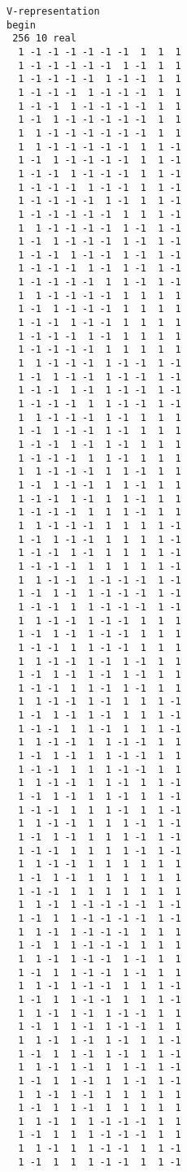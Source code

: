 \documentclass[%
 showpacs,
 showkeys,
 preprintnumbers,
 amsmath,amssymb,
 aps,
  pra,
  longbibliography,
 floatfix,
 ]{revtex4-1}
\begin{document}
{\begin{lstlisting}[backgroundcolor=\color{yellow!10},framerule=0pt,breaklines=true, frame=tb]
V-representation
begin
 256 10 real
  1 -1 -1 -1 -1 -1 -1  1  1  1
  1 -1 -1 -1 -1 -1  1 -1  1  1
  1 -1 -1 -1 -1  1 -1 -1  1  1
  1 -1 -1 -1  1 -1 -1 -1  1  1
  1 -1 -1  1 -1 -1 -1 -1  1  1
  1 -1  1 -1 -1 -1 -1 -1  1  1
  1  1 -1 -1 -1 -1 -1 -1  1  1
  1  1 -1 -1 -1 -1 -1  1  1 -1
  1 -1  1 -1 -1 -1 -1  1  1 -1
  1 -1 -1  1 -1 -1 -1  1  1 -1
  1 -1 -1 -1  1 -1 -1  1  1 -1
  1 -1 -1 -1 -1  1 -1  1  1 -1
  1 -1 -1 -1 -1 -1  1  1  1 -1
  1  1 -1 -1 -1 -1  1 -1  1 -1
  1 -1  1 -1 -1 -1  1 -1  1 -1
  1 -1 -1  1 -1 -1  1 -1  1 -1
  1 -1 -1 -1  1 -1  1 -1  1 -1
  1 -1 -1 -1 -1  1  1 -1  1 -1
  1  1 -1 -1 -1 -1  1  1  1  1
  1 -1  1 -1 -1 -1  1  1  1  1
  1 -1 -1  1 -1 -1  1  1  1  1
  1 -1 -1 -1  1 -1  1  1  1  1
  1 -1 -1 -1 -1  1  1  1  1  1
  1  1 -1 -1 -1  1 -1 -1  1 -1
  1 -1  1 -1 -1  1 -1 -1  1 -1
  1 -1 -1  1 -1  1 -1 -1  1 -1
  1 -1 -1 -1  1  1 -1 -1  1 -1
  1  1 -1 -1 -1  1 -1  1  1  1
  1 -1  1 -1 -1  1 -1  1  1  1
  1 -1 -1  1 -1  1 -1  1  1  1
  1 -1 -1 -1  1  1 -1  1  1  1
  1  1 -1 -1 -1  1  1 -1  1  1
  1 -1  1 -1 -1  1  1 -1  1  1
  1 -1 -1  1 -1  1  1 -1  1  1
  1 -1 -1 -1  1  1  1 -1  1  1
  1  1 -1 -1 -1  1  1  1  1 -1
  1 -1  1 -1 -1  1  1  1  1 -1
  1 -1 -1  1 -1  1  1  1  1 -1
  1 -1 -1 -1  1  1  1  1  1 -1
  1  1 -1 -1  1 -1 -1 -1  1 -1
  1 -1  1 -1  1 -1 -1 -1  1 -1
  1 -1 -1  1  1 -1 -1 -1  1 -1
  1  1 -1 -1  1 -1 -1  1  1  1
  1 -1  1 -1  1 -1 -1  1  1  1
  1 -1 -1  1  1 -1 -1  1  1  1
  1  1 -1 -1  1 -1  1 -1  1  1
  1 -1  1 -1  1 -1  1 -1  1  1
  1 -1 -1  1  1 -1  1 -1  1  1
  1  1 -1 -1  1 -1  1  1  1 -1
  1 -1  1 -1  1 -1  1  1  1 -1
  1 -1 -1  1  1 -1  1  1  1 -1
  1  1 -1 -1  1  1 -1 -1  1  1
  1 -1  1 -1  1  1 -1 -1  1  1
  1 -1 -1  1  1  1 -1 -1  1  1
  1  1 -1 -1  1  1 -1  1  1 -1
  1 -1  1 -1  1  1 -1  1  1 -1
  1 -1 -1  1  1  1 -1  1  1 -1
  1  1 -1 -1  1  1  1 -1  1 -1
  1 -1  1 -1  1  1  1 -1  1 -1
  1 -1 -1  1  1  1  1 -1  1 -1
  1  1 -1 -1  1  1  1  1  1  1
  1 -1  1 -1  1  1  1  1  1  1
  1 -1 -1  1  1  1  1  1  1  1
  1  1 -1  1 -1 -1 -1 -1  1 -1
  1 -1  1  1 -1 -1 -1 -1  1 -1
  1  1 -1  1 -1 -1 -1  1  1  1
  1 -1  1  1 -1 -1 -1  1  1  1
  1  1 -1  1 -1 -1  1 -1  1  1
  1 -1  1  1 -1 -1  1 -1  1  1
  1  1 -1  1 -1 -1  1  1  1 -1
  1 -1  1  1 -1 -1  1  1  1 -1
  1  1 -1  1 -1  1 -1 -1  1  1
  1 -1  1  1 -1  1 -1 -1  1  1
  1  1 -1  1 -1  1 -1  1  1 -1
  1 -1  1  1 -1  1 -1  1  1 -1
  1  1 -1  1 -1  1  1 -1  1 -1
  1 -1  1  1 -1  1  1 -1  1 -1
  1  1 -1  1 -1  1  1  1  1  1
  1 -1  1  1 -1  1  1  1  1  1
  1  1 -1  1  1 -1 -1 -1  1  1
  1 -1  1  1  1 -1 -1 -1  1  1
  1  1 -1  1  1 -1 -1  1  1 -1
  1 -1  1  1  1 -1 -1  1  1 -1

\end{lstlisting}}
\end{document}
